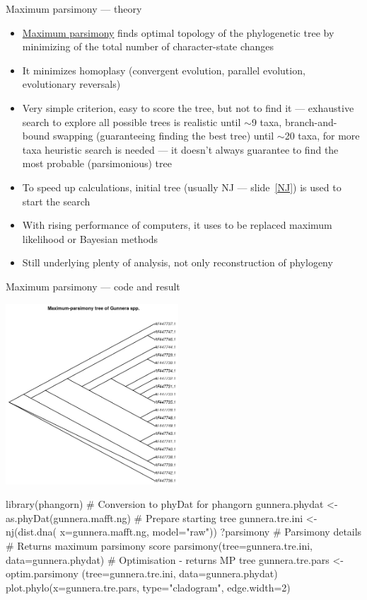 \documentclass[compress, ucs, xelatex, 11pt, xcolor=svgnames, aspectratio=169,
	hyperref={
		bookmarks=true,
		unicode=true,
		colorlinks=true,
		pdftitle={Molecular data in R},
		plainpages=false,
		pdfauthor={Vojtech Zeisek},
		pdfsubject={Course about phylogeny and evolution in R},
		pdfcreator={XeLaTeX},
		pdfkeywords={R, evolution, phylogeny, molecular data},
		linkcolor=Crimson, %
		anchorcolor=Magenta, %
		citecolor=Magenta, %
		filecolor=Magenta, %
		menucolor=Magenta, %
		urlcolor=DodgerBlue, %
		pdftex},
	url={hyphens, lowtilde} %
	]{beamer}
\begin{document}
\begin{frame}{Maximum parsimony --- theory}
	\label{MP}
	\begin{itemize}
		\item \href{https://en.wikipedia.org/wiki/Maximum_parsimony_(phylogenetics)}{Maximum parsimony} finds optimal topology of the phylogenetic tree by minimizing of the total number of character-state changes
		\item It minimizes homoplasy (convergent evolution, parallel evolution, evolutionary reversals)
		\item Very simple criterion, easy to score the tree, but not to find it --- exhaustive search to explore all possible trees is realistic until $\sim$9 taxa, branch-and-bound swapping (guaranteeing finding the best tree) until $\sim$20 taxa, for more taxa heuristic search is needed --- it doesn't always guarantee to find the most probable (parsimonious) tree
		\item To speed up calculations, initial tree (usually NJ --- slide~\ref{NJ}) is used to start the search
		\item With rising performance of computers, it uses to be replaced maximum likelihood or Bayesian methods
		\item Still underlying plenty of analysis, not only reconstruction of phylogeny
	\end{itemize}
\end{frame}

\begin{frame}[fragile]{Maximum parsimony --- code and result}
	\begin{multicols}{2}
		\begin{center}
			\includegraphics[height=6.75cm]{parsimony.png}
		\end{center}
		\begin{spluscode}
    library(phangorn)
    # Conversion to phyDat for phangorn
    gunnera.phydat <-
      as.phyDat(gunnera.mafft.ng)
    # Prepare starting tree
    gunnera.tre.ini <- nj(dist.dna(
      x=gunnera.mafft.ng, model="raw"))
    ?parsimony # Parsimony details
    # Returns maximum parsimony score
    parsimony(tree=gunnera.tre.ini,
      data=gunnera.phydat)
    # Optimisation - returns MP tree
    gunnera.tre.pars <- optim.parsimony
      (tree=gunnera.tre.ini,
      data=gunnera.phydat)
    plot.phylo(x=gunnera.tre.pars,
      type="cladogram", edge.width=2)
		\end{spluscode}
	\end{multicols}
\end{frame}
\end{document}
